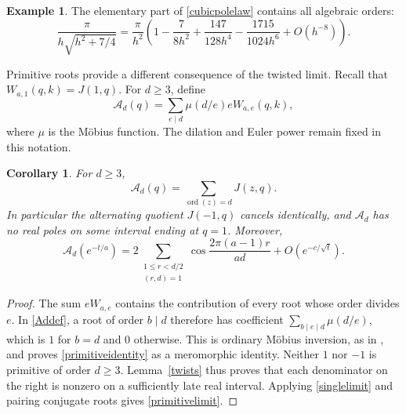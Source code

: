 \documentclass[11pt]{amsart}
\newtheorem{corollary}[theorem]{Corollary}
\theoremstyle{definition}
\newtheorem{example}[theorem]{Example}
\theoremstyle{remark}
\numberwithin{equation}{section}
\newcommand{\ord}{\operatorname{ord}}\newcommand{\Res}{\operatorname{Res}}
\begin{document}
\begin{example}
The elementary part of \eqref{cubicpolelaw} contains all algebraic orders:
\[
 \frac{\pi}{h\sqrt{h^2+7/4}}
 =\frac\pi{h^2}\left(1-\frac7{8h^2}+\frac{147}{128h^4}
             -\frac{1715}{1024h^6}+O(h^{-8})\right).
\]
\end{example}

Primitive roots provide a different consequence of the twisted limit. Recall that $W_{a,1}(q,k)=J(1,q)$. For $d\ge3$, define
\begin{equation}\label{Addef}
 \mathcal A_d(q)=\sum_{e\mid d}\mu(d/e)eW_{a,e}(q,k),
\end{equation}
where $\mu$ is the M\"obius function. The dilation and Euler power remain fixed in this notation.

\begin{corollary}\label{primitive}
For $d\ge3$,
\begin{equation}\label{primitiveidentity}
 \mathcal A_d(q)=\sum_{\ord(z)=d}J(z,q).
\end{equation}
In particular the alternating quotient $J(-1,q)$ cancels identically, and $\mathcal A_d$ has no real poles on some interval ending at $q=1$. Moreover,
\begin{equation}\label{primitivelimit}
 \mathcal A_d(e^{-t/a})=
 2\sum_{\substack{1\le r<d/2\\(r,d)=1}}
 \cos\frac{2\pi(a-1)r}{ad}+O(e^{-c/\sqrt t}).
\end{equation}
\end{corollary}
\begin{proof}
The sum $eW_{a,e}$ contains the contribution of every root whose order divides $e$. In \eqref{Addef}, a root of order $b\mid d$ therefore has coefficient
$\sum_{b\mid e\mid d}\mu(d/e)$, which is $1$ for $b=d$ and $0$ otherwise. This is ordinary M\"obius inversion, as in \cite[Chapter 3]{Stanley}, and proves \eqref{primitiveidentity} as a meromorphic identity. Neither $1$ nor $-1$ is primitive of order $d\ge3$. Lemma~\ref{twists} thus proves that each denominator on the right is nonzero on a sufficiently late real interval. Applying \eqref{singlelimit} and pairing conjugate roots gives \eqref{primitivelimit}.
\end{proof}
\end{document}
